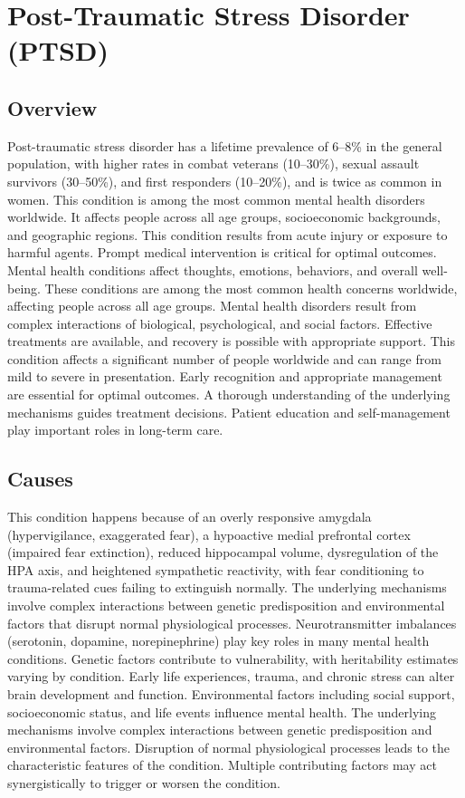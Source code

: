 \chapter{Post-Traumatic Stress Disorder (PTSD)}
\label{sec:Post-Traumatic Stress Disorder (PTSD)}

\section{Overview}
Post-traumatic stress disorder has a lifetime prevalence of 6--8\% in the general population, with higher rates in combat veterans (10--30\%), sexual assault survivors (30--50\%), and first responders (10--20\%), and is twice as common in women. This condition is among the most common mental health disorders worldwide. It affects people across all age groups, socioeconomic backgrounds, and geographic regions. This condition results from acute injury or exposure to harmful agents. Prompt medical intervention is critical for optimal outcomes. Mental health conditions affect thoughts, emotions, behaviors, and overall well-being. These conditions are among the most common health concerns worldwide, affecting people across all age groups. Mental health disorders result from complex interactions of biological, psychological, and social factors. Effective treatments are available, and recovery is possible with appropriate support. This condition affects a significant number of people worldwide and can range from mild to severe in presentation. Early recognition and appropriate management are essential for optimal outcomes. A thorough understanding of the underlying mechanisms guides treatment decisions. Patient education and self-management play important roles in long-term care.
\section{Causes}
This condition happens because of an overly responsive amygdala (hypervigilance, exaggerated fear), a hypoactive medial prefrontal cortex (impaired fear extinction), reduced hippocampal volume, dysregulation of the HPA axis, and heightened sympathetic reactivity, with fear conditioning to trauma-related cues failing to extinguish normally. The underlying mechanisms involve complex interactions between genetic predisposition and environmental factors that disrupt normal physiological processes. Neurotransmitter imbalances (serotonin, dopamine, norepinephrine) play key roles in many mental health conditions. Genetic factors contribute to vulnerability, with heritability estimates varying by condition. Early life experiences, trauma, and chronic stress can alter brain development and function. Environmental factors including social support, socioeconomic status, and life events influence mental health. The underlying mechanisms involve complex interactions between genetic predisposition and environmental factors. Disruption of normal physiological processes leads to the characteristic features of the condition. Multiple contributing factors may act synergistically to trigger or worsen the condition.
